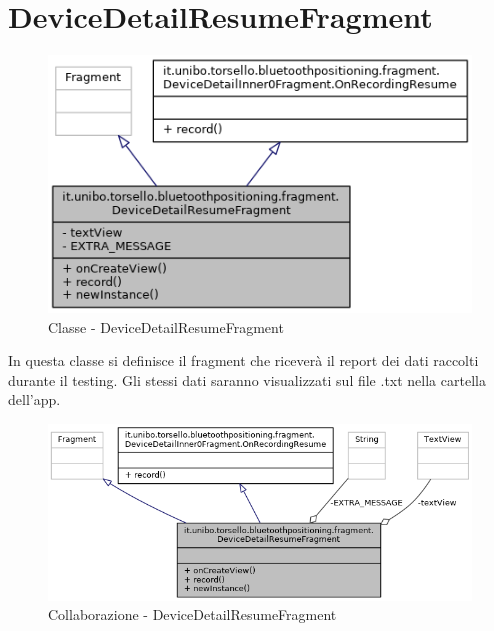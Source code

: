 \section{DeviceDetailResumeFragment}
\begin{figure}[ph]
	\centering
	\includegraphics[width=0.7\linewidth]{img/uml/class/classit_1_1unibo_1_1torsello_1_1bluetoothpositioning_1_1fragment_1_1DeviceDetailResumeFragment__inherit__graph.png}
	\caption{Classe - DeviceDetailResumeFragment}
\end{figure}

In questa classe si definisce il fragment che riceverà il report dei dati raccolti durante il testing. Gli stessi dati saranno visualizzati sul file .txt nella cartella dell'app.

\begin{figure}[ph]
	\centering
	\includegraphics[width=0.9\linewidth]{img/uml/class/classit_1_1unibo_1_1torsello_1_1bluetoothpositioning_1_1fragment_1_1DeviceDetailResumeFragment__coll__graph.png}
	\caption{Collaborazione - DeviceDetailResumeFragment}
\end{figure}

\newpage
